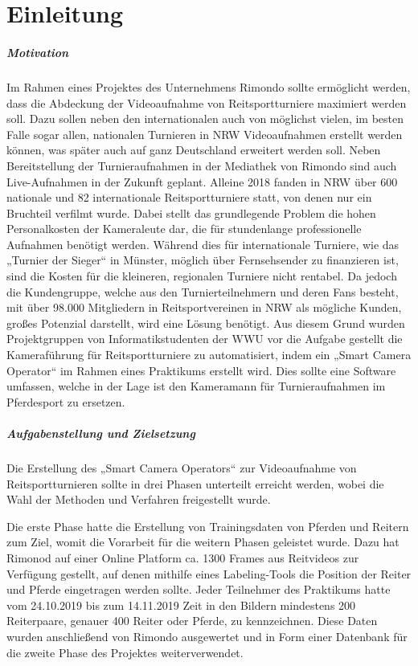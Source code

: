 \chapter{Einleitung}


\paragraph{Motivation}

Im Rahmen eines Projektes des Unternehmens Rimondo sollte ermöglicht werden, dass die Abdeckung der Videoaufnahme von Reitsportturniere maximiert werden soll. Dazu sollen neben den internationalen auch von möglichst vielen, im besten Falle sogar allen, nationalen Turnieren in NRW Videoaufnahmen erstellt werden können, was später auch auf ganz Deutschland erweitert werden soll. Neben Bereitstellung der Turnieraufnahmen in der Mediathek von Rimondo sind auch Live-Aufnahmen in der Zukunft geplant. Alleine 2018 fanden in NRW über 600 nationale und 82 internationale Reitsportturniere statt, von denen nur ein Bruchteil verfilmt wurde.
Dabei stellt das grundlegende Problem die hohen Personalkosten der Kameraleute dar, die für stundenlange professionelle Aufnahmen benötigt werden. Während dies für internationale Turniere, wie das „Turnier der Sieger“ in Münster, möglich über Fernsehsender zu finanzieren ist, sind die Kosten für die kleineren, regionalen Turniere nicht rentabel. Da jedoch die Kundengruppe, welche aus den Turnierteilnehmern und deren Fans besteht, mit über 98.000 Mitgliedern in Reitsportvereinen in NRW als mögliche Kunden, großes Potenzial darstellt, wird eine Lösung benötigt. Aus diesem Grund wurden Projektgruppen von Informatikstudenten der WWU vor die Aufgabe gestellt die Kameraführung für Reitsportturniere zu automatisiert, indem ein „Smart Camera Operator“ im Rahmen eines Praktikums erstellt wird. Dies sollte eine Software umfassen, welche in der Lage ist den Kameramann für Turnieraufnahmen im Pferdesport zu ersetzen.



\paragraph{Aufgabenstellung und Zielsetzung}

Die Erstellung des „Smart Camera Operators“ zur Videoaufnahme von Reitsportturnieren sollte in drei Phasen unterteilt erreicht werden, wobei die Wahl der Methoden und Verfahren freigestellt wurde.

Die erste Phase hatte die Erstellung von Trainingsdaten von Pferden und Reitern zum Ziel, womit die Vorarbeit für die weitern Phasen geleistet wurde. Dazu hat Rimonod auf einer Online Platform ca. 1300 Frames aus Reitvideos zur Verfügung gestellt, auf denen mithilfe eines Labeling-Tools die Position der Reiter und Pferde eingetragen werden sollte. Jeder Teilnehmer des Praktikums hatte vom 24.10.2019 bis zum 14.11.2019 Zeit in den Bildern mindestens 200 Reiterpaare, genauer 400 Reiter oder Pferde, zu kennzeichnen. Diese Daten wurden anschließend von Rimondo ausgewertet und in Form einer Datenbank für die zweite Phase des Projektes weiterverwendet. 

